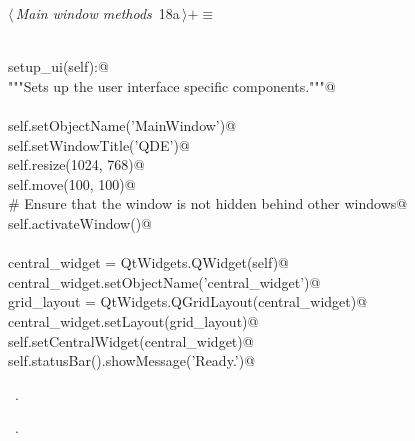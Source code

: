 \documentclass[
    a4paper,      %
    10pt,         %
    openright,    %
    notitlepage,  %
    parskip=half, %
]{scrreprt}       %
\theoremstyle{definition}                    %
\begin{document}
\begin{flushleft} \small
\begin{minipage}{\linewidth}\label{scrap12}\raggedright\small
{} $\langle\,${\itshape Main window methods}\nobreak\ {\footnotesize {18a}}$\,\rangle+\equiv$
\vspace{-1ex}
\begin{list}{}{} \item
\mbox{}\lstinline@@\\
\mbox{}\lstinline@def setup_ui(self):@\\
\mbox{}\lstinline@    """Sets up the user interface specific components."""@\\
\mbox{}\lstinline@@\\
\mbox{}\lstinline@    self.setObjectName('MainWindow')@\\
\mbox{}\lstinline@    self.setWindowTitle('QDE')@\\
\mbox{}\lstinline@    self.resize(1024, 768)@\\
\mbox{}\lstinline@    self.move(100, 100)@\\
\mbox{}\lstinline@    # Ensure that the window is not hidden behind other windows@\\
\mbox{}\lstinline@    self.activateWindow()@\\
\mbox{}\lstinline@@\\
\mbox{}\lstinline@    central_widget = QtWidgets.QWidget(self)@\\
\mbox{}\lstinline@    central_widget.setObjectName('central_widget')@\\
\mbox{}\lstinline@    grid_layout = QtWidgets.QGridLayout(central_widget)@\\
\mbox{}\lstinline@    central_widget.setLayout(grid_layout)@\\
\mbox{}\lstinline@    self.setCentralWidget(central_widget)@\\
\mbox{}\lstinline@    self.statusBar().showMessage('Ready.')@\\
\mbox{}\lstinline@@{\NWsep}
\end{list}
\vspace{-1.5ex}
\footnotesize
\begin{list}{}{\setlength{\itemsep}{-\parsep}\setlength{\itemindent}{-\leftmargin}}
\item \NWtxtMacroDefBy\ .
\item \NWtxtMacroRefIn\ .

\item{}
\end{list}
\end{minipage}\vspace{4ex}
\end{flushleft}
\end{document}
